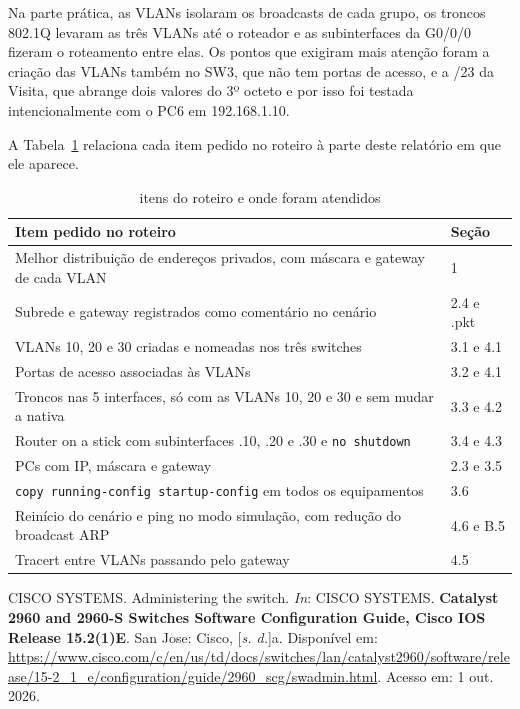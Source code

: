 Na parte prática, as VLANs isolaram os broadcasts de cada grupo, os troncos 802.1Q levaram as três VLANs até o roteador e as subinterfaces da G0/0/0 fizeram o roteamento entre elas. Os pontos que exigiram mais atenção foram a criação das VLANs também no SW3, que não tem portas de acesso, e a /23 da Visita, que abrange dois valores do 3º octeto e por isso foi testada intencionalmente com o PC6 em 192.168.1.10.

A Tabela~\ref{tab:roteiro} relaciona cada item pedido no roteiro à parte deste relatório em que ele aparece.

\begin{table}[H]
\caption{itens do roteiro e onde foram atendidos}\label{tab:roteiro}
\footnotesize\renewcommand{\arraystretch}{1.12}
\begin{tabularx}{\textwidth}{@{}>{\raggedright\arraybackslash}Xl@{}}
\toprule
\textbf{Item pedido no roteiro} & \textbf{Seção}\\
\midrule
Melhor distribuição de endereços privados, com máscara e gateway de cada VLAN & 1\\
Subrede e gateway registrados como comentário no cenário & 2.4 e .pkt\\
VLANs 10, 20 e 30 criadas e nomeadas nos três switches & 3.1 e 4.1\\
Portas de acesso associadas às VLANs & 3.2 e 4.1\\
Troncos nas 5 interfaces, só com as VLANs 10, 20 e 30 e sem mudar a nativa & 3.3 e 4.2\\
Router on a stick com subinterfaces .10, .20 e .30 e \texttt{no shutdown} & 3.4 e 4.3\\
PCs com IP, máscara e gateway & 2.3 e 3.5\\
\texttt{copy running-config startup-config} em todos os equipamentos & 3.6\\
Reinício do cenário e ping no modo simulação, com redução do broadcast ARP & 4.6 e B.5\\
Tracert entre VLANs passando pelo gateway & 4.5\\
\bottomrule
\end{tabularx}
\fonte
\end{table}


\begingroup
{}
\setlength{\parskip}{3pt}
\raggedright
CISCO SYSTEMS. Administering the switch. \emph{In}: CISCO SYSTEMS. \textbf{Catalyst 2960 and 2960-S Switches Software Configuration Guide, Cisco IOS Release 15.2(1)E}. San Jose: Cisco, [\emph{s. d.}]a. Disponível em: \url{https://www.cisco.com/c/en/us/td/docs/switches/lan/catalyst2960/software/release/15-2_1_e/configuration/guide/2960_scg/swadmin.html}. Acesso em: 1 out. 2026.

